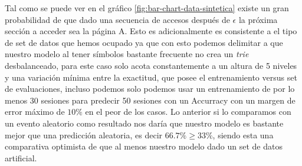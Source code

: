 	Tal como se puede ver en el gráfico \ref{fig:bar-chart-data-sintetica} existe un gran probabilidad de que dado una secuencia de accesos después de $\epsilon$ la próxima sección a acceder sea la página A.
	Esto es adicionalmente es consistente a el tipo de set de datos que hemos ocupado ya que con esto podemos delimitar a que nuestro modelo al tener símbolos bastante frecuente no crea un \emph{trie} desbalanceado, para este caso solo acota constantemente a un altura de 5 niveles y una variación mínima entre la exactitud, que posee el entrenamiento versus set de evaluaciones, incluso podemos solo podemos usar un entrenamiento de por lo menos 30 sesiones para predecir 50 sesiones con un Accurracy con un margen de error máximo de $10\%$ en el peor de los casos. 
	Lo anterior si lo comparamos con un evento aleatorio como resultado nos daría que nuestro modelo es bastante mejor que una predicción aleatoria, es decir $ 66.7\%  \geq 33\%$, siendo esta una comparativa optimista de que al menos nuestro modelo dado un set de datos artificial.
	



	